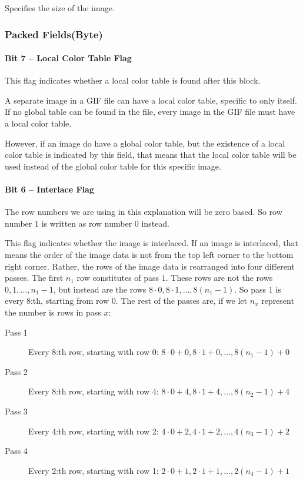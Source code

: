 Specifies the size of the image.

\subsubsection{Packed Fields(Byte)}

\paragraph{Bit 7 -- Local Color Table Flag}

This flag indicates whether a local color table is found after this
block.

A separate image in a GIF file can have a local color table, specific
to only itself. If no global table can be found in the file, every
image in the GIF file must have a local color table.

However, if an image do have a global color table, but the existence
of a local color table is indicated by this field, that means that the
local color table will be used instead of the global color table for
this specific image.

\paragraph{Bit 6 -- Interlace Flag}

The row numbers we are using in this explanation will be zero
based. So row number $1$ is written as row number $0$ instead.

This flag indicates whether the image is interlaced. If an image is
interlaced, that means the order of the image data is not from the top
left corner to the bottom right corner. Rather, the rows of the image
data is rearranged into four different passes. The first $n_1$ row
constitutes of pass $1$. These rows are not the rows
$0,1,\dots,n_1-1$, but instead are the rows $8 \cdot 0, 8 \cdot 1,
\dots, 8(n_1-1)$. So pass 1 is every 8:th, starting from row $0$. The
rest of the passes are, if we let $n_x$ represent the number is rows
in pass $x$:

\newcommand{\passrows}[3]{$#1 \cdot 0 + #2, #1 \cdot 1 + #2, \dots,
  #1(n_{#3}-1) + #2$}

\begin{description}
\item[Pass 1] Every 8:th row, starting with row 0: \passrows{8}{0}{1}
\item[Pass 2] Every 8:th row, starting with row 4: \passrows{8}{4}{2}
\item[Pass 3] Every 4:th row, starting with row 2: \passrows{4}{2}{3}
\item[Pass 4] Every 2:th row, starting with row 1: \passrows{2}{1}{4}
\end{description}

